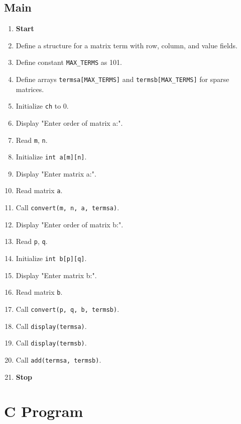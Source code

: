 {  \subsection{Main}

  \begin{enumerate}[label=\arabic*.,left=0pt]
    \item \textbf{Start}
    \item Define a structure for a matrix term with row, column, and value fields.
    \item Define constant \texttt{MAX\_TERMS} as 101.\
    \item Define arrays \texttt{termsa[MAX\_TERMS]} and \texttt{termsb[MAX\_TERMS]} for sparse matrices.
    \item Initialize \texttt{ch} to 0.
    \item Display "Enter order of matrix a:".
    \item Read \texttt{m}, \texttt{n}.
    \item Initialize \texttt{int a[m][n]}.
    \item Display "Enter matrix a:".
    \item Read matrix \texttt{a}.
    \item Call \texttt{convert(m, n, a, termsa)}.
    \item Display "Enter order of matrix b:".
    \item Read \texttt{p}, \texttt{q}.
    \item Initialize \texttt{int b[p][q]}.
    \item Display "Enter matrix b:".
    \item Read matrix \texttt{b}.
    \item Call \texttt{convert(p, q, b, termsb)}.
    \item Call \texttt{display(termsa)}.
    \item Call \texttt{display(termsb)}.
    \item Call \texttt{add(termsa, termsb)}.
    \item \textbf{Stop}
  \end{enumerate}
 }

\section{C Program}

